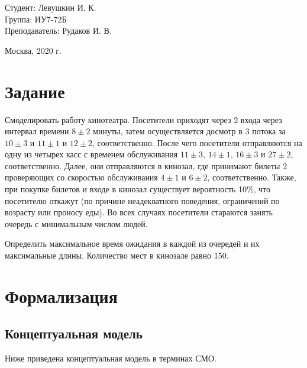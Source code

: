 \documentclass[a4paper,12pt]{article}
\begin{document}
	\large
	\begin{flushright}
		Студент: Левушкин И. К. \\
		Группа: ИУ7-72Б \\
		Преподаватель: Рудаков И. В. \\
	\end{flushright}
	
	\vspace*{25mm}
	\begin{center}
		Москва, 2020 г.  
	\end{center}
	\thispagestyle{empty}
	
	
	\newpage
	
	\section*{Задание}
	
	Смоделировать работу кинотеатра. Посетители приходят через 2 входа через интервал времени $8 \pm 2$ минуты, затем осуществляется досмотр в 3 потока за $10 \pm 3$ и $11 \pm 1$ и $12 \pm 2$, соответственно. После чего посетители отправляются на одну из четырех касс с временем обслуживания $11 \pm 3$, $14 \pm 1$,  $16 \pm 3$ и $27 \pm 2$, соответственно. Далее, они отправляются в кинозал, где принимают билеты 2 проверяющих со скоростью обслуживания $4 \pm 1$ и $6 \pm 2$, соответственно. Также, при покупке билетов и входе в кинозал существует вероятность 10\%, что посетителю откажут (по причине неадекватного поведения, ограничений по возрасту или проносу еды).
	Во всех случаях посетители стараются занять очередь с минимальным числом людей.
	
	Определить максимальное время ожидания в каждой из очередей и их максимальные длины.
	Количество мест в кинозале равно 150.
	
	\newpage
	
	\section*{Формализация}
	
	\subsection*{Концептуальная модель}
	
	Ниже приведена концептуальная модель в терминах СМО.
	
\end{document}

